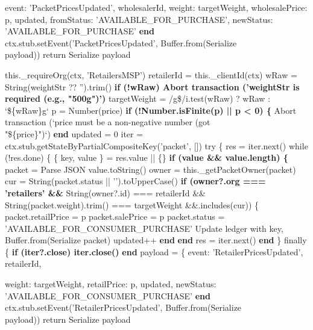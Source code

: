 \documentclass[12pt]{article}
\begin{document}
\begin{algorithm}[H]
\caption{setPacketPriceForWeight() (Part 2 of 2)}
event: 'PacketPricesUpdated',\;
wholesalerId,\;
weight: targetWeight,\;
wholesalePrice: p,\;
updated,\;
fromStatus: 'AVAILABLE\_FOR\_PURCHASE',\;
newStatus: 'AVAILABLE\_FOR\_PURCHASE'\;
\textbf{end}\;
ctx.stub.setEvent('PacketPricesUpdated', Buffer.from(Serialize\\
\quad payload))\;
return Serialize payload\;
\end{algorithm}


\begin{algorithm}[H]
\caption{setRetailerPriceForWeight() (Part 1 of 2)}
this.\_requireOrg(ctx, 'RetailersMSP')\;
retailerId = this.\_clientId(ctx)\;
wRaw = String(weightStr ?? '').trim()\;
\textbf{if (!wRaw) Abort transaction ('weightStr is required (e.g., "500g")')}\;
targetWeight = /g\$/i.test(wRaw) ? wRaw : `\$\{wRaw\}g`\;
p = Number(price)\;
\textbf{if (!Number.isFinite(p) || p < 0) \{}\;
Abort transaction (`price must be a non-negative number (got\\
\quad "\$\{price\}")`)\;
\textbf{end}\;
updated = 0\;
iter = ctx.stub.getStateByPartialCompositeKey('packet', [])\;
try \{\;
res = iter.next()\;
while (!res.done) \{\;
\{ key, value \} = res.value || \{\}\;
\textbf{if (value \&\& value.length) \{}\;
packet = Parse JSON value.toString()\;
owner = this.\_getPacketOwner(packet)\;
cur = String(packet.status || '').toUpperCase()\;
\textbf{if (owner?.org === 'retailers' \&\&}\;
String(owner?.id) === retailerId \&\&\;
String(packet.weight).trim() === targetWeight \&\&.includes(cur)) \{\;
packet.retailPrice = p\;
packet.salePrice = p\;
packet.status = 'AVAILABLE\_FOR\_CONSUMER\_PURCHASE'\;
Update ledger with key, Buffer.from(Serialize packet)\;
updated++\;
\textbf{end}\;
\textbf{end}\;
res = iter.next()\;
\textbf{end}\;
\} finally \{\;
\textbf{if (iter?.close) iter.close()}\;
\textbf{end}\;
payload = \{\;
event: 'RetailerPricesUpdated',\;
retailerId,\;
\end{algorithm}


\begin{algorithm}[H]
\caption{setRetailerPriceForWeight() (Part 2 of 2)}
weight: targetWeight,\;
retailPrice: p,\;
updated,\;
newStatus: 'AVAILABLE\_FOR\_CONSUMER\_PURCHASE'\;
\textbf{end}\;
ctx.stub.setEvent('RetailerPricesUpdated', Buffer.from(Serialize\\
\quad payload))\;
return Serialize payload\;
\end{algorithm}
\end{document}
